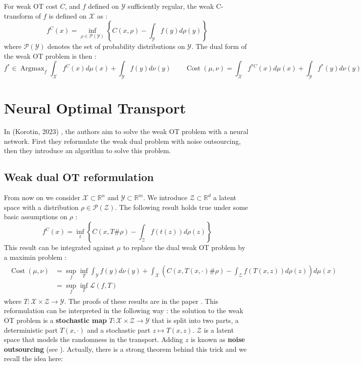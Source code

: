 \documentclass[11pt]{article}
\newcommand{\R}{\mathbb{R}}
\DeclareMathOperator*{\Argmax}{\text{Argmax}}
\DeclareMathOperator*{\Cost}{\text{Cost}}
\begin{document}
For weak OT cost $C$, and $f$ defined on $\mathcal{Y}$ sufficiently regular, the weak C-transform of $f$ is defined on $\mathcal{X}$ as :
\begin{equation}
    f^C(x) = \inf_{\rho\in \mathcal{P}(\mathcal{Y})} \left\{C(x,\rho)-\int_{\mathcal{Y}}f(y)d\rho(y)\right\}
\end{equation}
where $\mathcal{P}(\mathcal{Y})$ denotes the set of probability distributions on $\mathcal{Y}$. The dual form of the weak OT problem is then :
\begin{equation}
    f^*\in\Argmax_{f} \int_{\mathcal{X}} f^C(x)d\mu(x) + \int_{\mathcal{Y}} f(y)d\nu(y) \quad\quad \Cost(\mu,\nu) = \int_{\mathcal{X}} f^{*C}(x)d\mu(x) + \int_{\mathcal{Y}} f^*(y)d\nu(y)
\end{equation}

\section{Neural Optimal Transport}

In (Korotin, 2023) \cite{korotin-2022}, the authors aim to solve the weak OT problem with a neural network. First they reformulate the weak dual problem with noise outsourcing, then they introduce an algorithm to solve this problem.

\subsection{Weak dual OT reformulation}

From now on we consider $\mathcal{X}\subset\R^n$ and $\mathcal{Y}\subset\R^m$. We introduce $\mathcal{Z}\subset\R^d$ a latent space with a distribution $\rho\in \mathcal{P}(\mathcal{Z})$. The following result holds true under some basic assumptions on $\rho$ :
\begin{equation}
    f^C(x)=\inf_t \left\{C(x, T\#\rho)-\int_{\mathcal{Z}}f(t(z))d\rho(z)\right\}
\end{equation}
This result can be integrated against $\mu$ to replace the dual weak OT problem by a maximin problem :
\begin{align}
    \begin{split}
        \Cost(\mu,\nu) & = \sup_{f} \inf_{T}
        \int_{\mathcal{Y}}f(y)d\nu(y) + \int_{\mathcal{X}} \left( C(x, T(x,\cdot)\#\rho)-\int_{\mathcal{Z}}f(T(x,z))d\rho(z)\right)d\mu(x) \\
                       & = \sup_{f} \inf_{T} \mathcal{L}(f,T)
    \end{split}
    \label{eq:weak_ot_reformulation}
\end{align}
where $T:\mathcal{X}\times\mathcal{Z}\to\mathcal{Y}$. The proofs of these results are in the paper \cite{korotin-2022}. This reformulation can be interpreted in the following way : the solution to the weak OT problem is a \textbf{stochastic map} $T:\mathcal{X}\times \mathcal{Z}\to \mathcal{Y}$ that is split into two parts, a deterministic part $T(x,\cdot)$ and a stochastic part $z\mapsto T(x,z)$. $\mathcal{Z}$ is a latent space that models the randomness in the transport. Adding $z$ is known as \textbf{noise outsourcing} (see \cite{kallenberg2002foundations}). Actually, there is a strong theorem behind this trick and we recall the idea here:
\end{document}
